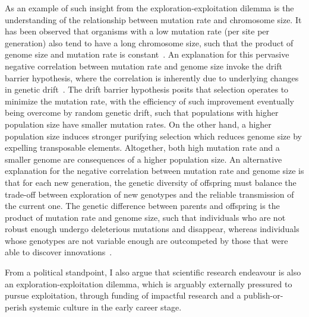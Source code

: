 As an example of such insight from the exploration-exploitation dilemma is the understanding of the relationship between mutation rate and chromosome size.
It has been observed that organisms with a low mutation rate (per site per generation) also tend to have a long chromosome size, such that the product of genome size and mutation rate is constant~\citep{Drake1991}.
An explanation for this pervasive negative correlation between mutation rate and genome size invoke the drift barrier hypothesis, where the correlation is inherently due to underlying changes in genetic drift~\citep{Lynch2016a}.
The drift barrier hypothesis posits that selection operates to minimize the mutation rate, with the efficiency of such improvement eventually being overcome by random genetic drift, such that populations with higher population size have smaller mutation rates.
On the other hand, a higher population size induces stronger purifying selection which reduces genome size by expelling transposable elements.
Altogether, both high mutation rate and a smaller genome are consequences of a higher population size.
An alternative explanation for the negative correlation between mutation rate and genome size is that for each new generation, the genetic diversity of offspring must balance the trade-off between exploration of new genotypes and the reliable transmission of the current one.
The genetic difference between parents and offspring is the product of mutation rate and genome size, such that individuals who are not robust enough undergo deleterious mutations and disappear, whereas individuals whose genotypes are not variable enough are outcompeted by those that were able to discover innovations~\citep{Knibbe2007, Beslon2010, Hindre2012, Batut2014, Biller2016}.

From a political standpoint, I also argue that scientific research endeavour is also an exploration-exploitation dilemma, which is arguably externally pressured to pursue exploitation, through funding of impactful research and a publish-or-perish systemic culture in the early career stage.
